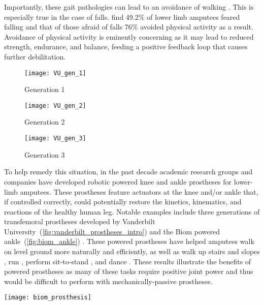 Importantly, these gait pathologies can lead to an avoidance of walking
\citep{gauthier1999enabling}. This is especially true in the case of falls.
\citet{miller2001prevalence} find 49.2\% of lower limb amputees feared falling
and that of those afraid of falls 76\% avoided physical activity as a result.
Avoidance of physical activity is eminently concerning as it may lead to reduced
strength, endurance, and balance, feeding a positive feedback loop that causes
further debilitation.
\begin{figure*}[b]
    \centering
	\begin{subfigure}[b]{0.3\textwidth}
    	\centering
        \texttt{[image: VU\_gen\_1]}
        \caption{Generation 1}
	\end{subfigure}
	\begin{subfigure}[b]{0.3\textwidth}
    	\centering
        \texttt{[image: VU\_gen\_2]}
        \caption{Generation 2}
	\end{subfigure}
	\begin{subfigure}[b]{0.3\textwidth}
    	\centering
        \texttt{[image: VU\_gen\_3]}
        \caption{Generation 3}
	\end{subfigure}
    \caption{Vanderbilt University's Robotic Transfemoral
    Prostheses. Images courtesy of Michael Goldfarb.\vspace{0.1in}}
    \label{fig:vanderbilt_prostheses_intro}
\end{figure*}

To help remedy this situation, in the past decade academic research groups and
companies have developed robotic powered knee and ankle prostheses for
lower-limb amputees.  These prostheses feature actuators at the knee and/or
ankle that, if controlled correctly, could potentially restore the kinetics,
kinematics, and reactions of the healthy human leg. Notable examples include
three generations of transfemoral prostheses developed by Vanderbilt
University~(\cref{fig:vanderbilt_prostheses_intro}) \citep{sup2009preliminary,
lawson2013control, lawson2014robotic} and the Biom powered
ankle~(\cref{fig:biom_ankle}) \citep{herr2012bionic}. These powered prostheses
have helped amputees walk on level ground more naturally and efficiently, as
well as walk up stairs and slopes \citep{sup2011upslope, lawson2013control}, run
\citep{huff2012running, shultz2015running}, perform sit-to-stand
\citep{varol2009powered}, and dance \citep{rouse2015design}. These results
illustrate the benefits of powered prostheses as many of these tasks require
positive joint power and thus would be difficult to perform with
mechanically-passive prostheses.

\begin{marginfigure}[-1in]
    \centering
    \texttt{[image: biom\_prosthesis]}
    \caption{Biom Robotic Ankle Prosthesis. Photo by
    \href{https://www.flickr.com/photos/jurvetson/13480667874/}{Steve
    Jurvetson}, \href{http://creativecommons.org/licenses/by/2.0}{CC BY 2.0},
    \href{https://commons.wikimedia.org/w/index.php?curid=32568854}{Link}
    (cropped from original).}
    \label{fig:biom_ankle}
\end{marginfigure}
